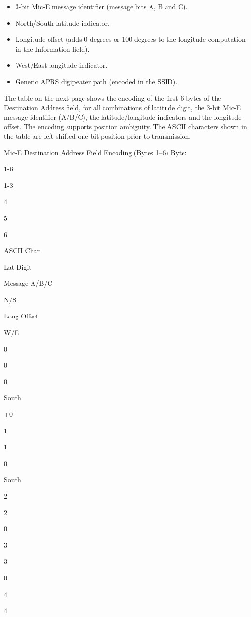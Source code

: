 {{{{{\begin{itemize}
\item 3-bit Mic-E message identifier (message bits A, B and C).

\item North/South latitude indicator.

\item Longitude offset (adds 0 degrees or 100 degrees to the longitude
computation in the Information field).

\item West/East longitude indicator.

\item Generic APRS digipeater path (encoded in the SSID).

\end{itemize}
  
The table on the next page shows the encoding of the first 6 bytes of the
Destination Address field, for all combinations of latitude digit, the 3-bit
Mic-E message identifier (A/B/C), the latitude/longitude indicators and the
longitude offset.
The encoding supports position ambiguity.
The ASCII characters shown in the table are left-shifted one bit position prior
to transmission.



Mic-E Destination Address Field Encoding (Bytes 1–6)
Byte:

1-6

1-3

4

5

6

ASCII
Char

Lat
Digit

Message
A/B/C

N/S

Long
Offset

W/E

0

0

0

South

+0

1

1

0

South

2

2

0

3

3

0

4

4

}}}}}

